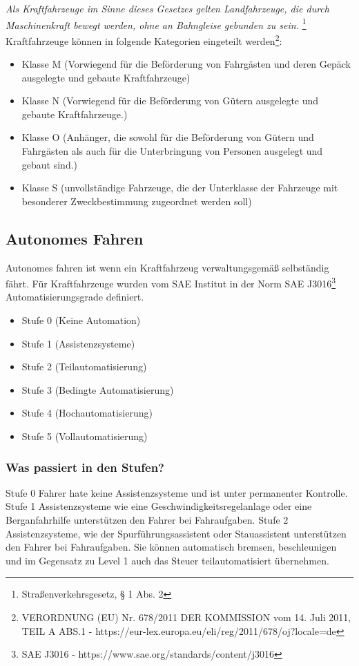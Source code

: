 \textit{Als Kraftfahrzeuge im Sinne dieses Gesetzes gelten Landfahrzeuge, die durch Maschinenkraft bewegt werden, ohne an Bahngleise gebunden zu sein.}
\footnote{Straßenverkehrsgesetz, § 1 Abs. 2}
\newline
\newline
Kraftfahrzeuge können in folgende Kategorien eingeteilt werden\footnote{VERORDNUNG (EU) Nr. 678/2011 DER KOMMISSION
	vom 14. Juli 2011, TEIL A ABS.1 - https://eur-lex.europa.eu/eli/reg/2011/678/oj?locale=de}:
\begin{itemize}
	\item Klasse M (Vorwiegend für die Beförderung von Fahrgästen und deren Gepäck ausgelegte und gebaute Kraftfahrzeuge)
	\item Klasse N (Vorwiegend für die Beförderung von Gütern ausgelegte und gebaute Kraftfahrzeuge.)
	\item Klasse O (Anhänger, die sowohl für die Beförderung von Gütern und Fahrgästen als auch für die Unterbringung von Personen ausgelegt und gebaut sind.)
	\item Klasse S (unvollständige Fahrzeuge, die der Unterklasse der Fahrzeuge mit besonderer Zweckbestimmung zugeordnet werden soll)
\end{itemize}


\subsection{Autonomes Fahren}

Autonomes fahren ist wenn ein Kraftfahrzeug verwaltungsgemäß selbständig fährt.
\newline
Für Kraftfahrzeuge wurden vom SAE Institut in der Norm SAE J3016\footnote{SAE J3016 - https://www.sae.org/standards/content/j3016} Automatisierungsgrade definiert.
\begin{itemize}
	\item Stufe 0 (Keine Automation)
	\item Stufe 1 (Assistenzsysteme)
	\item Stufe 2 (Teilautomatisierung)
	\item Stufe 3 (Bedingte Automatisierung)
	\item Stufe 4 (Hochautomatisierung)
	\item Stufe 5 (Vollautomatisierung)
\end{itemize}
\subsubsection{Was passiert in den Stufen?}
Stufe 0
Fahrer hate keine Assistenzsysteme und ist unter permanenter Kontrolle.
\newline
Stufe 1
Assistenzsysteme wie eine Geschwindigkeitsregelanlage oder eine Berganfahrhilfe unterstützen den Fahrer bei Fahraufgaben.
\newline
Stufe 2
Assistenzsysteme, wie der Spurführungsassistent oder Stauassistent unterstützen den Fahrer bei Fahraufgaben.
\newline
Sie können automatisch bremsen, beschleunigen und im Gegensatz zu Level 1 auch das Steuer teilautomatisiert übernehmen.


